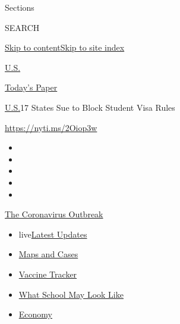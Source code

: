 Sections

SEARCH

\protect\hyperlink{site-content}{Skip to
content}\protect\hyperlink{site-index}{Skip to site index}

\href{https://www.nytimes.com/section/us}{U.S.}

\href{https://myaccount.nytimes.com/auth/login?response_type=cookie\&client_id=vi}{}

\href{https://www.nytimes.com/section/todayspaper}{Today's Paper}

\href{/section/us}{U.S.}\textbar{}17 States Sue to Block Student Visa
Rules

\url{https://nyti.ms/2Oiop3w}

\begin{itemize}
\item
\item
\item
\item
\item
\end{itemize}

\href{https://www.nytimes.com/news-event/coronavirus?action=click\&pgtype=Article\&state=default\&region=TOP_BANNER\&context=storylines_menu}{The
Coronavirus Outbreak}

\begin{itemize}
\tightlist
\item
  live\href{https://www.nytimes.com/2020/08/02/world/coronavirus-updates.html?action=click\&pgtype=Article\&state=default\&region=TOP_BANNER\&context=storylines_menu}{Latest
  Updates}
\item
  \href{https://www.nytimes.com/interactive/2020/us/coronavirus-us-cases.html?action=click\&pgtype=Article\&state=default\&region=TOP_BANNER\&context=storylines_menu}{Maps
  and Cases}
\item
  \href{https://www.nytimes.com/interactive/2020/science/coronavirus-vaccine-tracker.html?action=click\&pgtype=Article\&state=default\&region=TOP_BANNER\&context=storylines_menu}{Vaccine
  Tracker}
\item
  \href{https://www.nytimes.com/interactive/2020/07/29/us/schools-reopening-coronavirus.html?action=click\&pgtype=Article\&state=default\&region=TOP_BANNER\&context=storylines_menu}{What
  School May Look Like}
\item
  \href{https://www.nytimes.com/live/2020/07/31/business/stock-market-today-coronavirus?action=click\&pgtype=Article\&state=default\&region=TOP_BANNER\&context=storylines_menu}{Economy}
\end{itemize}

